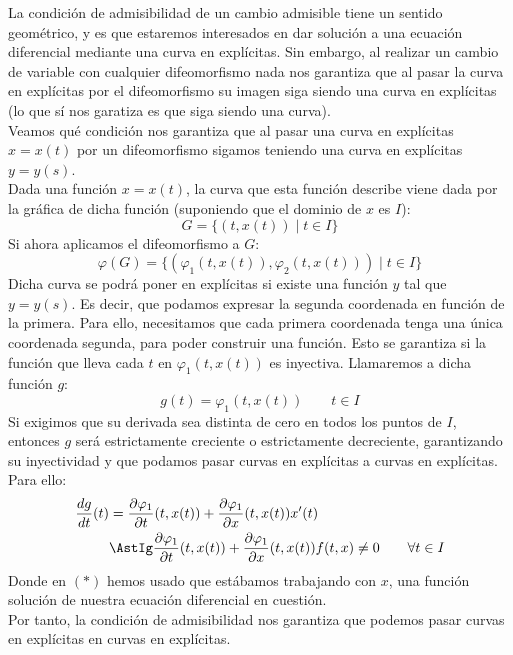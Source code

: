 \begin{observacion}
    La condición de admisibilidad de un cambio admisible tiene un sentido geométrico, y es que estaremos interesados en dar solución a una ecuación diferencial mediante una curva en explícitas. Sin embargo, al realizar un cambio de variable con cualquier difeomorfismo nada nos garantiza que al pasar la curva en explícitas por el difeomorfismo su imagen siga siendo una curva en explícitas (lo que sí nos garatiza es que siga siendo una curva).\\

    Veamos qué condición nos garantiza que al pasar una curva en explícitas $x=x(t)$ por un difeomorfismo
    sigamos teniendo una curva en explícitas $y = y(s)$.\\

    Dada una función $x=x(t)$, la curva que esta función describe viene dada por la gráfica de dicha función (suponiendo que el dominio de $x$ es $I$):
    \begin{equation*}
        G = \{(t,x(t)) \mid t \in I\}
    \end{equation*}
    Si ahora aplicamos el difeomorfismo a $G$:
    \begin{equation*}
        \varphi(G) = \{(\varphi_1(t,x(t)), \varphi_2(t,x(t))) \mid t\in I\}
    \end{equation*}
    Dicha curva se podrá poner en explícitas si existe una función $y$ tal que $y = y(s)$. Es decir, que podamos expresar la segunda coordenada en función de la primera. Para ello, necesitamos que cada primera coordenada tenga una única coordenada segunda, para poder construir una función. Esto se garantiza si la función que lleva cada $t$ en $\varphi_1(t,x(t))$ es inyectiva. Llamaremos a dicha función $g$:
    \begin{equation*}
        g(t) = \varphi_1(t,x(t)) \qquad t\in I
    \end{equation*}
    Si exigimos que su derivada sea distinta de cero en todos los puntos de $I$, entonces $g$ será estrictamente creciente o estrictamente decreciente, garantizando su inyectividad y que podamos pasar curvas en explícitas a curvas en explícitas. Para ello:
    \begin{align*}
        \dfrac{dg}{dt}(t) &= \dfrac{\partial\varphi_1}{\partial t}(t,x(t)) + \dfrac{\partial \varphi_1}{\partial x}(t,x(t))x'(t) \\ &\AstIg \dfrac{\partial\varphi_1}{\partial t}(t,x(t)) + \dfrac{\partial \varphi_1}{\partial x}(t,x(t))f(t,x) \neq 0 \qquad \forall t\in I
    \end{align*}
    Donde en $(\ast)$ hemos usado que estábamos trabajando con $x$, una función solución de nuestra ecuación diferencial en cuestión.\\

    Por tanto, la condición de admisibilidad nos garantiza que podemos pasar curvas en explícitas en curvas en explícitas.
\end{observacion}

